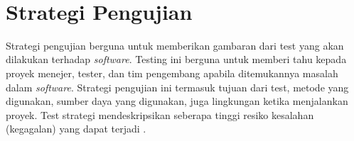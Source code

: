 \begin{adjustbox}{width=1\textwidth}
	\centering
	\begin{minipage}{\linewidth}
	\end{minipage}
\end{adjustbox}\\
\section{Strategi Pengujian}
Strategi pengujian berguna untuk memberikan gambaran dari test yang akan dilakukan terhadap \textit{software}. Testing ini berguna untuk memberi tahu kepada proyek menejer, tester, dan tim pengembang apabila ditemukannya masalah dalam \textit{software}. Strategi pengujian ini termasuk tujuan dari test, metode yang digunakan, sumber daya yang digunakan, juga lingkungan ketika menjalankan proyek. Test strategi mendeskripsikan seberapa tinggi resiko kesalahan (kegagalan) yang dapat terjadi \cite{12}. 
